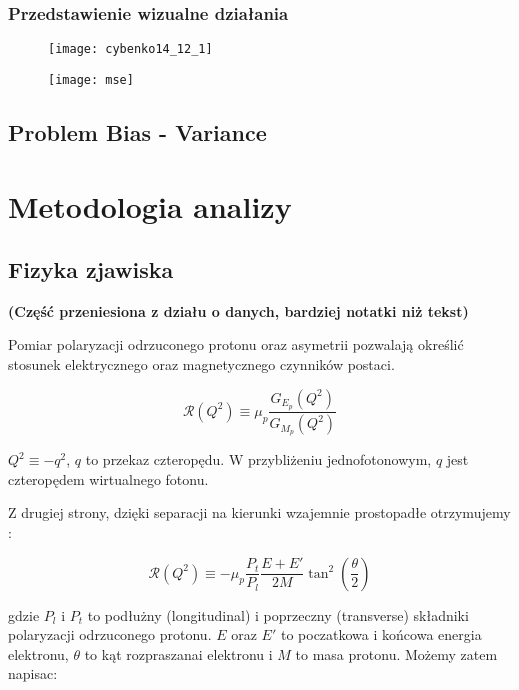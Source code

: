 \documentclass[11pt]{book}
\theoremstyle{definition}
\begin{document}
\subsection{Przedstawienie wizualne działania}



\begin{figure}[h!]
	\centering
	\texttt{[image: cybenko14\_12\_1]}
	
\end{figure}

\begin{figure}[h!]
	\centering
	\texttt{[image: mse]}
	
\end{figure}



\section{Problem Bias - Variance}

\newpage
\chapter{Metodologia analizy}

\section{Fizyka zjawiska}

\textbf{(Część przeniesiona z działu o danych, bardziej notatki niż tekst)}

Pomiar polaryzacji odrzuconego protonu oraz asymetrii pozwalają określić stosunek elektrycznego oraz magnetycznego czynników postaci.

$$
\mathcal{R}\left(Q^2\right) \equiv \mu_p \frac{G_{E_p}\left(Q^2\right)}{G_{M_p}\left(Q^2\right)}
$$

$ Q^2 \equiv - q^2 $, $q$ to przekaz czteropędu. W przybliżeniu jednofotonowym, $q$ jest czteropędem wirtualnego fotonu. 

Z drugiej strony, dzięki separacji na kierunki wzajemnie prostopadłe otrzymujemy \cite{2007PrPNP..59..694P}:

$$
\mathcal{R}\left(Q^2\right) \equiv -\mu_p  \frac{P_t}{P_l} \frac{E + E'}{2M} \tan^2  \left(\frac{\theta}{2}\right) 
$$

gdzie $P_l$ i $P_t$ to podłużny (longitudinal) i poprzeczny (transverse) składniki polaryzacji odrzuconego protonu. $E$ oraz $E'$ to poczatkowa i końcowa energia elektronu, $\theta$ to kąt rozpraszanai elektronu i $M$ to masa protonu. Możemy zatem napisac:
\end{document}
